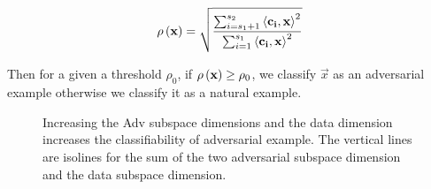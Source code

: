 \begin{equation}
  \rho\left({{\mathbf{x}}}\right) = \sqrt{\dfrac{\sum_{i=s_1+1}^{s_2}\left\langle{{\mathbf{c_i}}},{{\mathbf{x}}}\right\rangle^2}{ \sum_{i=1}^{s_1} \left\langle{{\mathbf{c_i}}},{{\mathbf{x}}}\right\rangle^2}}
\end{equation}

Then for a given a threshold \(\rho_0\), if \(\rho\left({{\mathbf{x}}}\right)\ge \rho_0\), we classify \(\vec{x}\) as an adversarial example otherwise we classify it as a natural example. 


\begin{figure}[t]
  \centering
  \begin{subfigure}[t]{0.49\linewidth}
    \def\svgwidth{0.99\columnwidth}
    
    \label{fig:dir-adv-att-repr}
  \end{subfigure}
  \begin{subfigure}[t]{0.49\linewidth}
    \def\svgwidth{0.99\columnwidth}
    
    \label{fig:dir-adv-att-inp}
  \end{subfigure}
  \caption{Increasing the Adv subspace dimensions and the data dimension increases the classifiability of adversarial example. The vertical lines are isolines for the sum of the two adversarial subspace dimension and the data subspace dimension.}
\end{figure}



